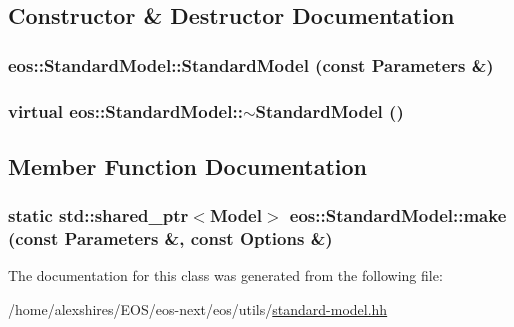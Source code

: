 \subsection{Constructor \& Destructor Documentation}
\hypertarget{classeos_1_1StandardModel_a45216b3c32798230199b30a851bf93de}{
\subsubsection[{StandardModel}]{\setlength{\rightskip}{0pt plus 5cm}eos::StandardModel::StandardModel (const {\bf Parameters} \&)}}
\label{classeos_1_1StandardModel_a45216b3c32798230199b30a851bf93de}
\hypertarget{classeos_1_1StandardModel_afb4b2be07ec8a7df31889ad89a6a0bf8}{
\subsubsection[{$\sim$StandardModel}]{\setlength{\rightskip}{0pt plus 5cm}virtual eos::StandardModel::$\sim$StandardModel ()}}
\label{classeos_1_1StandardModel_afb4b2be07ec8a7df31889ad89a6a0bf8}


\subsection{Member Function Documentation}
\hypertarget{classeos_1_1StandardModel_ae94ae93a0f5a53b3bbe545ba26a82b13}{
\subsubsection[{make}]{\setlength{\rightskip}{0pt plus 5cm}static std::shared\_\-ptr$<${\bf Model}$>$ eos::StandardModel::make (const {\bf Parameters} \&, \/  const {\bf Options} \&)}}
\label{classeos_1_1StandardModel_ae94ae93a0f5a53b3bbe545ba26a82b13}


The documentation for this class was generated from the following file:\begin{DoxyCompactItemize}
\item 
/home/alexshires/EOS/eos-\/next/eos/utils/\hyperlink{standard-model_8hh}{standard-\/model.hh}\end{DoxyCompactItemize}
